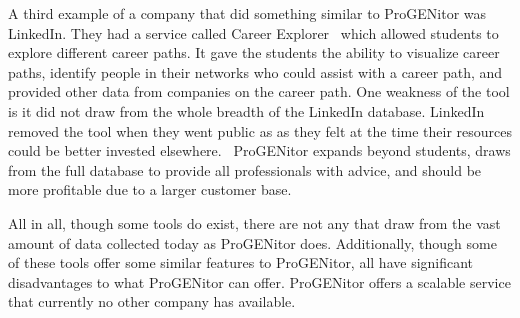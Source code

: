 A third example of a company that did something similar to ProGENitor was
LinkedIn.  They had a service called Career Explorer~\cite{careerexplorer} which
allowed students to explore different career paths.  It gave the students the
ability to visualize career paths, identify people in their networks who could
assist with a career path, and provided other data from companies on the career
path.  One weakness of the tool is it did not draw from the whole breadth of the
LinkedIn database.  LinkedIn removed the tool when they went public as as they
felt at the time their resources could be better invested
elsewhere.~\cite{liresources}  ProGENitor expands beyond students, draws from
the full database to provide all professionals with advice, and should be more
profitable due to a larger customer base.

All in all, though some tools do exist, there are not any that draw from the
vast amount of data collected today as ProGENitor does.  Additionally, though
some of these tools offer some similar features to ProGENitor, all have
significant disadvantages to what ProGENitor can offer.  ProGENitor offers a
scalable service that currently no other company has available.
